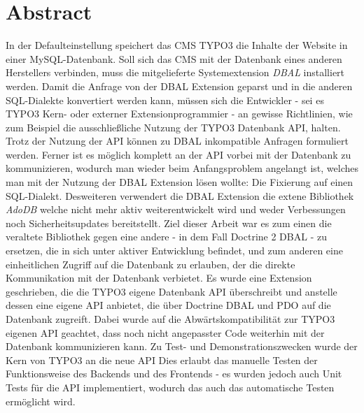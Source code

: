 \chapter{Abstract}
\label{ch:abstract}
In der Defaulteinstellung speichert das CMS TYPO3 die Inhalte der Website in einer MySQL-Datenbank. Soll sich das CMS mit der Datenbank eines anderen Herstellers verbinden, muss die mitgelieferte Systemextension \emph{DBAL} installiert werden. Damit die Anfrage von der DBAL Extension geparst und in die anderen SQL-Dialekte konvertiert werden kann, müssen sich die Entwickler - sei es TYPO3 Kern- oder externer Extensionprogrammier - an gewisse Richtlinien, wie zum Beispiel die ausschließliche Nutzung der TYPO3 Datenbank API, halten. Trotz der Nutzung der API können zu DBAL inkompatible Anfragen formuliert werden. Ferner ist es möglich komplett an der API vorbei mit der Datenbank zu kommunizieren, wodurch man wieder beim Anfangsproblem angelangt ist, welches man mit der Nutzung der DBAL Extension lösen wollte: Die Fixierung auf einen SQL-Dialekt. Desweiteren verwendert die DBAL Extension die extene Bibliothek \emph{AdoDB} welche nicht mehr aktiv weiterentwickelt wird und weder Verbessungen noch Sicherheitsupdates bereitstellt. Ziel dieser Arbeit war es zum einen die veraltete Bibliothek gegen eine andere - in dem Fall Doctrine 2 DBAL - zu ersetzen, die in sich unter aktiver Entwicklung befindet, und zum anderen eine einheitlichen Zugriff auf die Datenbank zu erlauben, der die direkte Kommunikation mit der Datenbank verbietet. Es wurde eine Extension geschrieben, die die TYPO3 eigene Datenbank API überschreibt und anstelle dessen eine eigene API anbietet, die über Doctrine DBAL und PDO auf die Datenbank zugreift. Dabei wurde auf die Abwärtskompatibilität zur TYPO3 eigenen API geachtet, dass noch nicht angepasster Code weiterhin mit der Datenbank kommunizieren kann. Zu Test- und Demonstrationszwecken wurde der Kern von TYPO3 an die neue API Dies erlaubt das manuelle Testen der Funktionsweise des Backends und des Frontends - es wurden jedoch auch Unit Tests für die API implementiert, wodurch das auch das automatische Testen ermöglicht wird.
